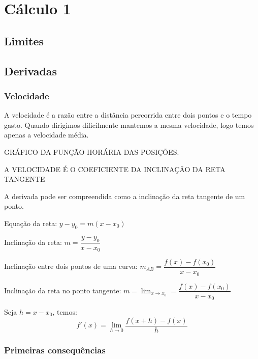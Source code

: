 \chapter{Cálculo 1}
\section{Limites}


\section{Derivadas}

\subsection{Velocidade}
A velocidade é a razão entre a distância percorrida entre dois pontos e o tempo gasto. Quando dirigimos dificilmente mantemos a mesma velocidade, logo temos apenas a velocidade média.

GRÁFICO DA FUNÇÃO HORÁRIA DAS POSIÇÕES.

A VELOCIDADE É O COEFICIENTE DA INCLINAÇÃO DA RETA TANGENTE



A derivada pode ser compreendida como a inclinação da reta tangente de um ponto.


Equação da reta: $y-y_0=m(x-x_0)$

Inclinação da reta: $m=\dfrac{y-y_0}{x-x_0}$

Inclinação entre dois pontos de uma curva: $m_{AB}=\dfrac{f(x)-f(x_0)}{x-x_0}$

Inclinação da reta no ponto tangente: $m=\lim_{x\rightarrow x_0} =\dfrac{f(x)-f(x_0)}{x-x_0}$

Seja $h=x-x_0$, temos:
\begin{equation}\label{5.1}
    f'(x)=\lim_{h \rightarrow 0}\dfrac{f(x+h)-f(x)}{h}
\end{equation}

\subsection{Primeiras consequências}

